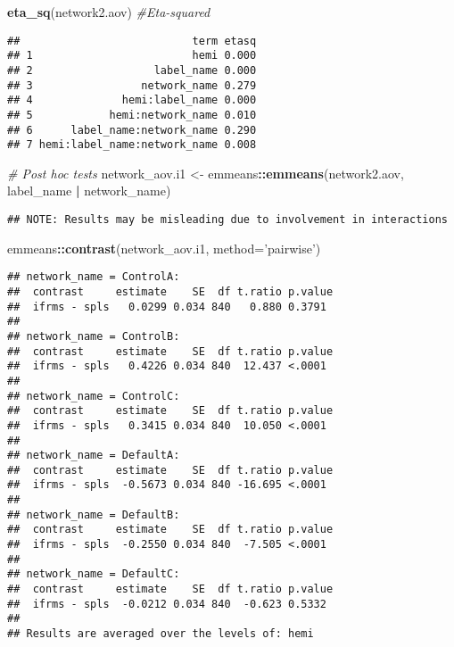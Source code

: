 \documentclass[
]{article}
\newenvironment{Shaded}{\begin{snugshade}}{\end{snugshade}}
\newcommand{\CommentTok}[1]{\textcolor[rgb]{0.56,0.35,0.01}{\textit{#1}}}
\newcommand{\DataTypeTok}[1]{\textcolor[rgb]{0.13,0.29,0.53}{#1}}
\newcommand{\KeywordTok}[1]{\textcolor[rgb]{0.13,0.29,0.53}{\textbf{#1}}}
\newcommand{\NormalTok}[1]{#1}
\newcommand{\OperatorTok}[1]{\textcolor[rgb]{0.81,0.36,0.00}{\textbf{#1}}}
\newcommand{\StringTok}[1]{\textcolor[rgb]{0.31,0.60,0.02}{#1}}
\begin{document}
\begin{Shaded}
\begin{Highlighting}[]
\KeywordTok{eta_sq}\NormalTok{(network2.aov) }\CommentTok{#Eta-squared}
\end{Highlighting}
\end{Shaded}

\begin{verbatim}
##                           term etasq
## 1                         hemi 0.000
## 2                   label_name 0.000
## 3                 network_name 0.279
## 4              hemi:label_name 0.000
## 5            hemi:network_name 0.010
## 6      label_name:network_name 0.290
## 7 hemi:label_name:network_name 0.008
\end{verbatim}

\begin{Shaded}
\begin{Highlighting}[]
\CommentTok{# Post hoc tests}
\NormalTok{network_aov.i1 <-}\StringTok{ }\NormalTok{emmeans}\OperatorTok{::}\KeywordTok{emmeans}\NormalTok{(network2.aov, }\OperatorTok{~}\StringTok{ }\NormalTok{label_name }\OperatorTok{|}\StringTok{ }\NormalTok{network_name)}
\end{Highlighting}
\end{Shaded}

\begin{verbatim}
## NOTE: Results may be misleading due to involvement in interactions
\end{verbatim}

\begin{Shaded}
\begin{Highlighting}[]
\NormalTok{emmeans}\OperatorTok{::}\KeywordTok{contrast}\NormalTok{(network_aov.i1, }\DataTypeTok{method=}\StringTok{'pairwise'}\NormalTok{)}
\end{Highlighting}
\end{Shaded}

\begin{verbatim}
## network_name = ControlA:
##  contrast     estimate    SE  df t.ratio p.value
##  ifrms - spls   0.0299 0.034 840   0.880 0.3791 
## 
## network_name = ControlB:
##  contrast     estimate    SE  df t.ratio p.value
##  ifrms - spls   0.4226 0.034 840  12.437 <.0001 
## 
## network_name = ControlC:
##  contrast     estimate    SE  df t.ratio p.value
##  ifrms - spls   0.3415 0.034 840  10.050 <.0001 
## 
## network_name = DefaultA:
##  contrast     estimate    SE  df t.ratio p.value
##  ifrms - spls  -0.5673 0.034 840 -16.695 <.0001 
## 
## network_name = DefaultB:
##  contrast     estimate    SE  df t.ratio p.value
##  ifrms - spls  -0.2550 0.034 840  -7.505 <.0001 
## 
## network_name = DefaultC:
##  contrast     estimate    SE  df t.ratio p.value
##  ifrms - spls  -0.0212 0.034 840  -0.623 0.5332 
## 
## Results are averaged over the levels of: hemi
\end{verbatim}
\end{document}
